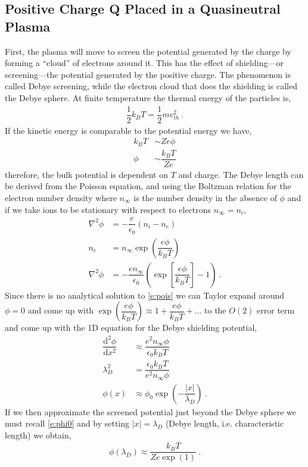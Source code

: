 \documentclass[10pt,a4paper]{article}
\begin{document}
	\subsection{Positive Charge Q Placed in a Quasineutral Plasma}\label{ss:1}
	First, the plasma will move to screen the potential generated by the charge by forming a ``cloud'' of electrons around it. This has the effect of shielding---or screening---the potential generated by the positive charge. The phenomenon is called Debye screening, while the electron cloud that does the shielding is called the Debye sphere. At finite temperature the thermal energy of the particles is,
	\begin{align}
		\dfrac{1}{2} k_{B} T = \dfrac{1}{2} m v_{th}^{2}~.
	\end{align}
	If the kinetic energy is comparable to the potential energy we have,
	\begin{subequations}
		\begin{align}
		k_{B}T &\sim Ze\phi \\
		\phi &\sim \dfrac{k_{B}T}{Ze}\label{e:phi0}
		\end{align}
	\end{subequations}
	therefore, the bulk potential is dependent on $T$ and charge. The Debye length can be derived from the Poisson equation, and using the Boltzman relation for the electron number density where $n_{\infty}$ is the number density in the absence of $\phi$ and if we take ions to be stationary with respect to electrons $n_{\infty} = n_{i}$,
	\begin{subequations}
		\begin{align}
			\nabla^{2} \phi &= - \dfrac{e}{\epsilon_{0}} (n_{i} - n_{e})\\
			n_{e} &= n_{\infty} \exp\left(\dfrac{e\phi}{k_{B}T}\right) \\
			\nabla^{2} \phi &= - \dfrac{e n_{\infty}}{\epsilon_{0}} \left(\exp\left[\dfrac{e\phi}{k_{B}T}\right] - 1 \right)~.\label{e:pois}
		\end{align}
	\end{subequations}
	Since there is no analytical solution to \cref{e:pois} we can Taylor expand around $\phi = 0$ and come up with $\exp\left(\dfrac{e\phi}{k_{B}T}\right) \approx 1 + \dfrac{e \phi}{k_{B}T} + \ldots$ to the $O(2)$ error term and come up with the 1D equation for the Debye shielding potential,
	\begin{align}
		\dfrac{\mathrm{d}^{2} \phi}{\mathrm{d} x^{2}} &\approx \dfrac{e^{2} n_{\infty} \phi}{\epsilon_{0} k_{B} T} \\
		\lambda_{D}^{2} &= \dfrac{\epsilon_{0} k_{B} T}{e^{2} n_{\infty} \phi} \\
		\phi(x) &\approx \phi_{0} \exp\left(-\dfrac{|x|}{\lambda_{D}}\right)~.
	\end{align}
	If we then approximate the screened potential just beyond the Debye sphere we must recall \cref{e:phi0} and by setting $|x| = \lambda_{D}$ (Debye length, i.e. characteristic length) we obtain,
	\begin{subequations}
		\begin{align}
			\phi(\lambda_{D}) \approx \dfrac{k_{B} T}{Z e \exp(1)}~.
		\end{align}
	\end{subequations}
	
\end{document}
